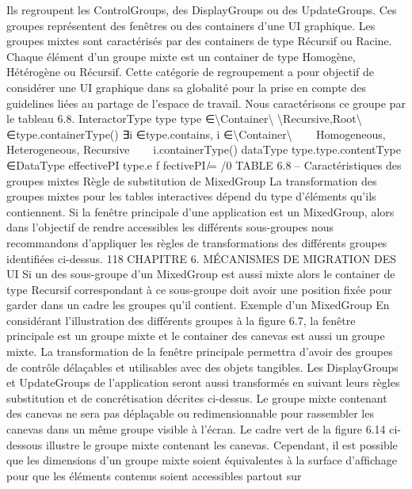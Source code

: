 \documentclass{article}
\begin{document}
Ils regroupent les ControlGroups, des DisplayGroups ou des UpdateGroups. Ces groupes repr\'{e}sentent des fen\^{e}tres ou des containers d’une UI graphique. Les groupes mixtes sont caract\'{e}ris\'{e}s par
des containers de type R\'{e}cursif ou Racine. Chaque \'{e}l\'{e}ment d’un groupe mixte est un container de
type Homog\`{e}ne, H\'{e}t\'{e}rog\`{e}ne ou R\'{e}cursif. Cette cat\'{e}gorie de regroupement a pour objectif de consid\'{e}rer une UI graphique dans sa globalit\'{e} pour la prise en compte des guidelines li\'{e}es au partage de
l’espace de travail. Nous caract\'{e}risons ce groupe par le tableau 6.8.
InteractorType
type
type ∈\textbackslash{}{Container\textbackslash{}}
\textbackslash{}{Recursive,Root\textbackslash{}} ∈type.containerType()
∃i ∈type.contains, i ∈\textbackslash{}{Container\textbackslash{}}



Homogeneous,
Heterogeneous,
Recursive


⊆i.containerType()
dataType
type.type.contentType ∈DataType
effectivePI
type.e f fectivePI ̸= /0
TABLE 6.8 – Caract\'{e}ristiques des groupes mixtes
R\`{e}gle de substitution de MixedGroup
La transformation des groupes mixtes pour les tables interactives d\'{e}pend du type d’\'{e}l\'{e}ments qu’ils contiennent.
Si la fen\^{e}tre principale d’une application est un MixedGroup, alors dans l’objectif de rendre accessibles les diff\'{e}rents sous-groupes nous recommandons d’appliquer les r\`{e}gles de transformations
des diff\'{e}rents groupes identiﬁ\'{e}es ci-dessus.
118
CHAPITRE 6. MÉCANISMES DE MIGRATION DES UI
Si un des sous-groupe d’un MixedGroup est aussi mixte alors le container de type Recursif correspondant \`{a} ce sous-groupe doit avoir une position ﬁx\'{e}e pour garder dans un cadre les groupes qu’il
contient.
Exemple d’un MixedGroup
En consid\'{e}rant l’illustration des diff\'{e}rents groupes \`{a} la ﬁgure 6.7, la
fen\^{e}tre principale est un groupe mixte et le container des canevas est aussi un groupe mixte.
La transformation de la fen\^{e}tre principale permettra d’avoir des groupes de contr\^{o}le d\'{e}la\c{c}ables
et utilisables avec des objets tangibles. Les DisplayGroups et UpdateGroups de l’application seront
aussi transform\'{e}s en suivant leurs r\`{e}gles substitution et de concr\'{e}tisation d\'{e}crites ci-dessus. Le groupe
mixte contenant des canevas ne sera pas d\'{e}pla\c{c}able ou redimensionnable pour rassembler les canevas
dans un m\^{e}me groupe visible \`{a} l’\'{e}cran. Le cadre vert de la ﬁgure 6.14 ci-dessous illustre le groupe
mixte contenant les canevas. Cependant, il est possible que les dimensions d’un groupe mixte soient
\'{e}quivalentes \`{a} la surface d’afﬁchage pour que les \'{e}l\'{e}ments contenus soient accessibles partout sur
\end{document}
